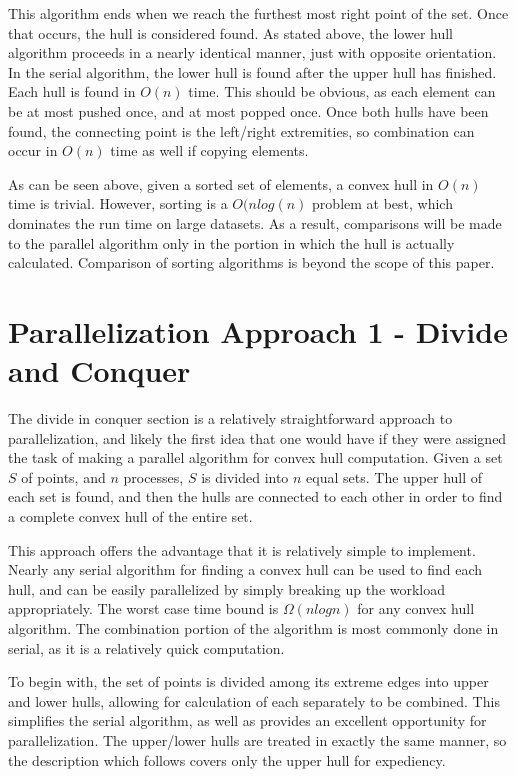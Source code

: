 \documentclass[conference]{IEEEtran}
\begin{document}
This algorithm ends when we reach the furthest most right point of the set. Once that occurs, the hull is considered found. As stated above, the lower hull algorithm proceeds in a nearly identical manner, just with opposite orientation. In the serial algorithm, the lower hull is found after the upper hull has finished. Each hull is found in $O(n)$ time. This should be obvious, as each element can be at most pushed once, and at most popped once. Once both hulls have been found, the connecting point is the left/right extremities, so combination can occur in $O(n)$ time as well if copying elements.

As can be seen above, given a sorted set of elements, a convex hull in $O(n)$ time is trivial. However, sorting is a $O(nlog(n)$ problem at best, which dominates the run time on large datasets. As a result, comparisons will be made to the parallel algorithm only in the portion in which the hull is actually calculated. Comparison of sorting algorithms is beyond the scope of this paper.

\section{Parallelization Approach 1 - Divide and Conquer}
The divide in conquer section is a relatively straightforward approach to parallelization, and likely the first idea that one would have if they were assigned the task of making a parallel algorithm for convex hull computation. Given a set $S$ of points, and $n$ processes, $S$ is divided into $n$ equal sets. The upper hull of each set is found, and then the hulls are connected to each other in order to find a complete convex hull of the entire set.

This approach offers the advantage that it is relatively simple to implement. Nearly any serial algorithm for finding a convex hull can be used to find each hull, and can be easily parallelized by simply breaking up the workload appropriately. The worst case time bound is $\Omega(n log n)$ for any convex hull algorithm. The combination portion of the algorithm is most commonly done in serial, as it is a relatively quick computation.

To begin with, the set of points is divided among its extreme edges into upper and lower hulls, allowing for calculation of each separately to be combined. This simplifies the serial algorithm, as well as provides an excellent opportunity for parallelization. The upper/lower hulls are treated in exactly the same manner, so the description which follows covers only the upper hull for expediency.
\end{document}
